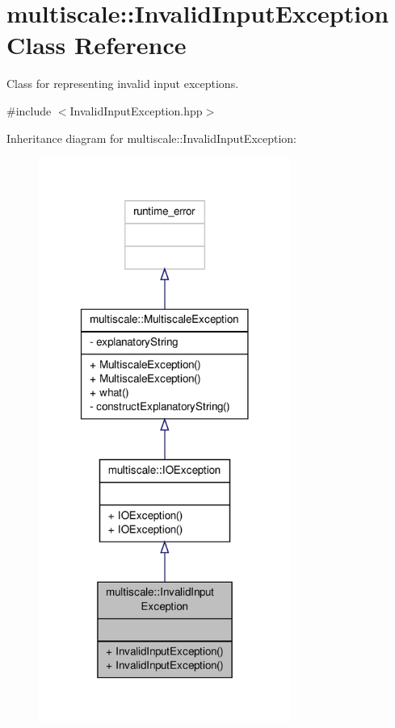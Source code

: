 \hypertarget{classmultiscale_1_1InvalidInputException}{\section{multiscale\-:\-:Invalid\-Input\-Exception Class Reference}
\label{classmultiscale_1_1InvalidInputException}
}


Class for representing invalid input exceptions.  




{\ttfamily \#include $<$Invalid\-Input\-Exception.\-hpp$>$}



Inheritance diagram for multiscale\-:\-:Invalid\-Input\-Exception\-:
\nopagebreak
\begin{figure}[H]
\begin{center}
\leavevmode
\includegraphics[width=234pt]{classmultiscale_1_1InvalidInputException__inherit__graph}
\end{center}
\end{figure}


